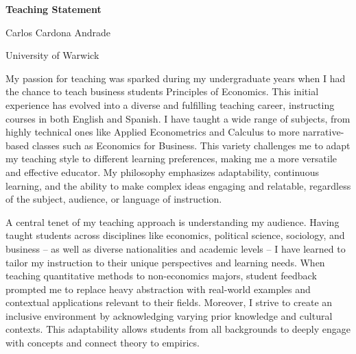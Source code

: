 \documentclass{article}
\begin{document}
\centering
\textbf{Teaching Statement}

Carlos Cardona Andrade

University of Warwick

\justify


My passion for teaching was sparked during my undergraduate years when I had the chance to teach business students Principles of Economics. This initial experience has evolved into a diverse and fulfilling teaching career, instructing courses in both English and Spanish. I have taught a wide range of subjects, from highly technical ones like Applied Econometrics and Calculus to more narrative-based classes such as Economics for Business. This variety challenges me to adapt my teaching style to different learning preferences, making me a more versatile and effective educator. My philosophy emphasizes adaptability, continuous learning, and the ability to make complex ideas engaging and relatable, regardless of the subject, audience, or language of instruction.

\medskip


A central tenet of my teaching approach is understanding my audience. Having taught students across disciplines like economics, political science, sociology, and business – as well as diverse nationalities and academic levels – I have learned to tailor my instruction to their unique perspectives and learning needs. When teaching quantitative methods to non-economics majors, student feedback prompted me to replace heavy abstraction with real-world examples and contextual applications relevant to their fields. Moreover, I strive to create an inclusive environment by acknowledging varying prior knowledge and cultural contexts. This adaptability allows students from all backgrounds to deeply engage with concepts and connect theory to empirics.
\end{document}
